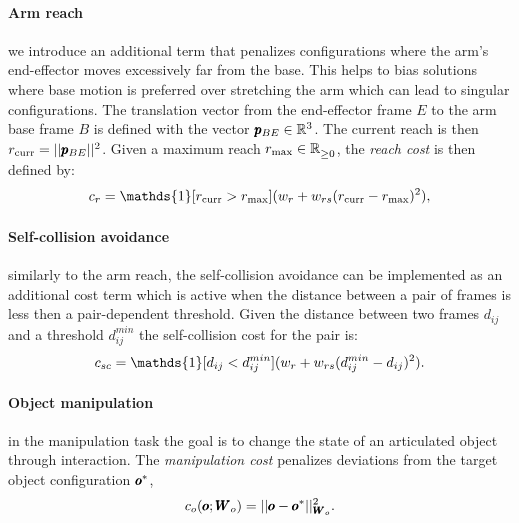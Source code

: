  \paragraph{Arm reach} we introduce an additional term that penalizes configurations where the arm's end-effector moves excessively far from the base. This helps to bias solutions where base motion is preferred over stretching the arm which can lead to singular configurations. The translation vector from the end-effector frame $E$ to the arm base frame $B$ is defined with the vector $\pmb{p}_{BE} \in \mathbb{R}^{3}$. The current reach is then $r_{\text{curr}} = || \pmb{p}_{BE} ||^2$. Given a maximum reach $r_{\text{max}} \in \mathbb{R}^{}_{\geq 0}$, the \textit{reach cost} is then defined by:
 \begin{equation}
   c_r = \mathds{1}[r_{\text{curr}} > r_{\text{max}}] (\weightScalar{r} + \weightScalar{rs}(r_{\text{curr}} - r_{\text{max}})^2),    
 \end{equation}

 \paragraph{Self-collision avoidance} similarly to the arm reach, the self-collision avoidance can be implemented as an additional cost term which is active when the distance between a pair of frames is less then a pair-dependent threshold. Given the distance between two frames $d_{ij}$ and a threshold $d^{min}_{ij}$ the self-collision cost for the pair is:
 \begin{equation}
   c_{sc} = \mathds{1}[d_{ij} < d^{min}_{ij}] (\weightScalar{r} + \weightScalar{rs}(d^{min}_{ij} - d_{ij})^2).    
 \end{equation}
 
 \paragraph{Object manipulation} in the manipulation task the goal is to change the state of an articulated object through interaction. The \textit{manipulation cost} penalizes deviations from the target object configuration $\pmb{o}^{*}$,
\begin{equation}
    c_o(\pmb{o}; \pmb{W}_{o}) = || \pmb{o} - \pmb{o}^{*}||^2_{\pmb{W}_{o}}.
\end{equation}
